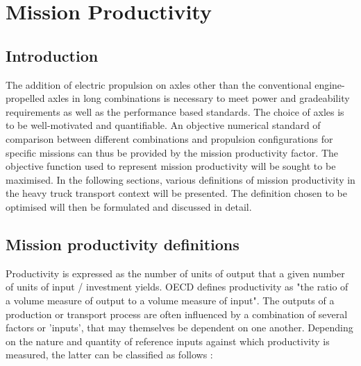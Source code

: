 \documentclass[ExampleMasters.tex]{subfiles}
\begin{document}
\chapter{Mission Productivity}

	\section{Introduction}
		The addition of electric propulsion on axles other than the conventional engine-propelled axles in long combinations is necessary to meet power and gradeability requirements as well as the performance based standards. The choice of axles is to be well-motivated and quantifiable. An objective numerical standard of comparison between different combinations and propulsion configurations for specific missions can thus be provided by the mission productivity factor. The objective function used to represent mission productivity will be sought to be maximised. In the following sections, various definitions of mission productivity in the heavy truck transport context will be presented. The definition chosen to be optimised will then be formulated and discussed in detail.\\ 

	\section{Mission productivity definitions}
		Productivity is expressed as the number of units of output that a given number of units of input / investment yields. OECD defines productivity as "the ratio of a volume measure of output to a volume measure of input"\cite{OECDProd}. The outputs of a production or transport process are often influenced by a combination of several factors or 'inputs', that may themselves be dependent on one another. Depending on the nature and quantity of reference inputs against which productivity is measured, the latter can be classified as follows \cite{JapSNAOECD}:
\end{document}
